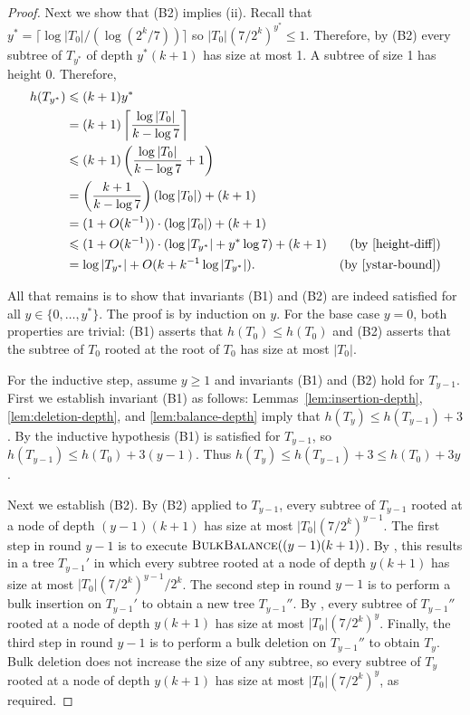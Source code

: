 \documentclass[kpfonts]{patmorin}
\let\le\leqslant
\let\ge\geqslant
\begin{document}
\begin{proof}
  Next we show that (B2) implies (ii).  Recall that $y^*=\lceil\log|T_0|/(\log(2^k/7))\rceil$ so
  $|T_{0}|(7/2^k)^{y^*} \le 1$.  Therefore, by (B2) every subtree of $T_{y^*}$ of depth $y^*(k+1)$ has size at most 1.  A subtree of size 1 has height 0.  Therefore,
  \begin{align*}
    h(T_{y^*}) & \le (k+1)y^* \\
    & = (k+1)\left\lceil \frac{\log|T_0|}{k-\log 7}\right\rceil \\
    & \le (k+1)\left(\frac{\log|T_0|}{k-\log 7 } + 1\right)\\
    & = \left(\frac{k+1}{k-\log 7}\right)\left(\log|T_0|\right) + (k+1)\\
    & = (1+O(k^{-1}))\cdot(\log|T_0|) + (k+1) \\
    & \le (1+O(k^{-1}))\cdot(\log|T_{y^*}| + y^*\log 7) + (k+1) & \text{(by \eqref{height-diff})}\\
    & = \log|T_{y^*}| + O(k+k^{-1}\log |T_{y^*}|). &\text{(by \eqref{ystar-bound})}
  \end{align*}


  All that remains is to show that invariants (B1) and (B2) are indeed satisfied for all $y\in\{0,\ldots,y^*\}$.  The proof is by induction on $y$.  For the base case $y=0$, both properties are trivial: (B1) asserts that $h(T_0)\le h(T_0)$ and (B2) asserts that the subtree of $T_0$ rooted at the root of $T_0$ has size at most $|T_0|$.

  For the inductive step, assume $y\ge 1$ and invariants (B1) and (B2) hold for $T_{y-1}$.  First we establish invariant (B1) as follows:
  Lemmas~\ref{lem:insertion-depth}, \ref{lem:deletion-depth}, and \ref{lem:balance-depth} imply that $h(T_y)\le h(T_{y-1})+3$.  
  By the inductive hypothesis (B1) is satisfied for $T_{y-1}$, so $h(T_{y-1})\le h(T_0)+3(y-1)$.  Thus $h(T_y)\le h(T_{y-1}) + 3 \le h(T_0)+3y$.
  
  Next we establish (B2).  By (B2) applied to $T_{y-1}$, every subtree of $T_{y-1}$ rooted at a node of depth $(y-1)(k+1)$ has size at most $|T_{0}|(7/2^k)^{y-1}$.  The first step in round $y-1$ is to execute $\textsc{BulkBalance}((y-1)(k+1))$.  By , this results in a tree $T_{y-1}'$ in which every subtree rooted at a node of depth $y(k+1)$ has size at most $|T_{0}|(7/2^k)^{y-1}/2^k$.  The second step in round $y-1$ is to perform a bulk insertion on $T_{y-1}'$ to obtain a new tree $T_{y-1}''$.  
  By , every subtree of $T_{y-1}''$ rooted at a node of depth $y(k+1)$ has size at most $|T_{0}|(7/2^k)^{y}$.  Finally, the third step in round $y-1$ is to perform a bulk deletion on $T_{y-1}''$ to obtain $T_{y}$.  Bulk deletion does not increase the size of any subtree, so every subtree of $T_{y}$ rooted at a node of depth $y(k+1)$ has size at most $|T_{0}|(7/2^k)^{y}$, as required.
\end{proof}
\end{document}

